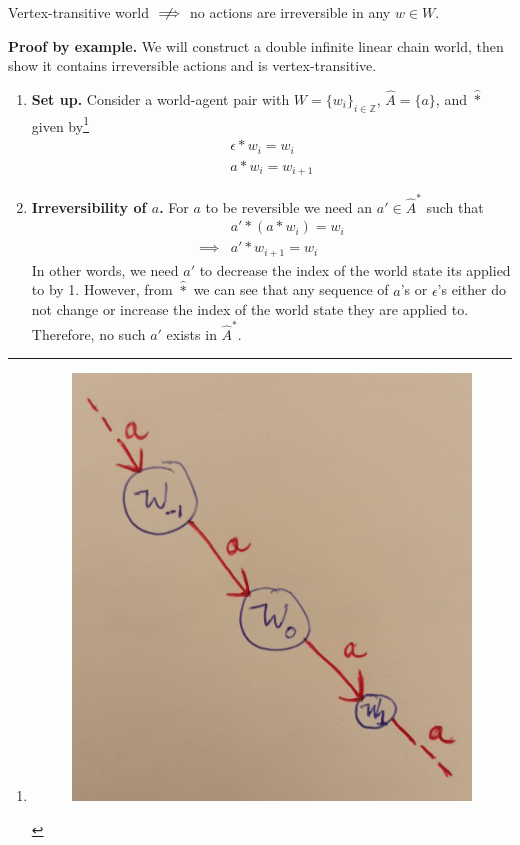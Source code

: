 \begin{propositionE}
    Vertex-transitive world $\centernot\implies$ no actions are irreversible in any $w \in W$.
\end{propositionE}
\begin{proofE}
    \textbf{Proof by example.}
    We will construct a double infinite linear chain world, then show it contains irreversible actions and is vertex-transitive.
\begin{enumerate}
    \item \textbf{Set up.}
    Consider a world-agent pair with $W = \{w_{i}\}_{i \in \mathbb{Z}}$, $\hat{A} = \{a\}$, and $\hat{\ast}$ given by\footnote{\begin{figure}[H]
        \includegraphics[width=0.5\linewidth]{6BeyondSBDRLLocalAlgebras/Images/infinite_double_linear_chain_world.jpeg}
        \caption{
        }
    \end{figure}}
    \begin{align}
        \epsilon \ast w_{i} = w_{i} \\
        a \ast w_{i} = w_{i+1}
    \end{align}

    \item \textbf{Irreversibility of $a$.}
    For $a$ to be reversible we need an $a' \in \hat{A}^{*}$ such that
    \begin{align}
        & a' \ast (a \ast w_{i}) = w_{i} \\
        \implies & a' \ast w_{i + 1} = w_{i}
    \end{align}
    In other words, we need $a'$ to decrease the index of the world state its applied to by 1.
    However, from $\hat{\ast}$ we can see that any sequence of $a$'s or $\epsilon$'s either do not change or increase the index of the world state they are applied to.
    Therefore, no such $a'$ exists in $\hat{A}^{*}$.


\end{enumerate}
\end{proofE}
